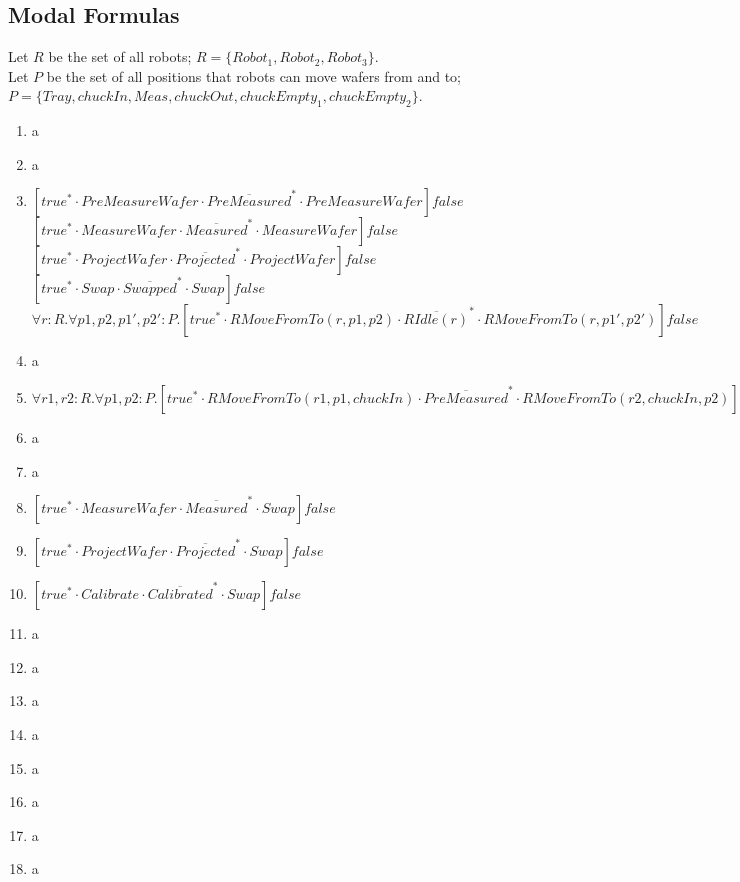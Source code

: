 \subsection{Modal Formulas}
Let $R$ be the set of all robots; $R = \{Robot_1, Robot_2, Robot_3\}$.\\
Let $P$ be the set of all positions that robots can move wafers from and to; $P = \{Tray, chuckIn, Meas, chuckOut, chuckEmpty_1, chuckEmpty_2\}$.
\begin{enumerate}
    \item a
    \item a
    \item 
	    $[true^{*}\cdot PreMeasureWafer \cdot \overline{PreMeasured}^{*} \cdot PreMeasureWafer]false$\\
	    $[true^{*}\cdot MeasureWafer \cdot \overline{Measured}^{*} \cdot MeasureWafer]false$\\
	    $[true^{*}\cdot ProjectWafer \cdot \overline{Projected}^{*} \cdot ProjectWafer]false$\\
	    $[true^{*}\cdot Swap \cdot \overline{Swapped}^{*} \cdot Swap]false$\\
	    $\forall r:R.\forall p1,p2,p1',p2':P.[true^{*}\cdot RMoveFromTo(r, p1, p2) \cdot \overline{RIdle(r)}^{*} \cdot RMoveFromTo(r, p1', p2')]false$\\
    \item a
    \item $\forall r1,r2:R.\forall p1,p2:P.[true^{*}\cdot RMoveFromTo(r1, p1, chuckIn) \cdot \overline{PreMeasured}^{*} \cdot RMoveFromTo(r2, chuckIn, p2)]false$
    \item a
    \item a
    \item $[true^{*}\cdot MeasureWafer\cdot \overline{Measured}^{*}\cdot Swap]false$
    \item $[true^{*}\cdot ProjectWafer\cdot \overline{Projected}^{*}\cdot Swap]false$
    \item $[true^{*}\cdot Calibrate\cdot \overline{Calibrated}^{*}\cdot Swap]false$
    \item a
    \item a
    \item a
    \item a
    \item a
    \item a
    \item a
    \item a
\end{enumerate}